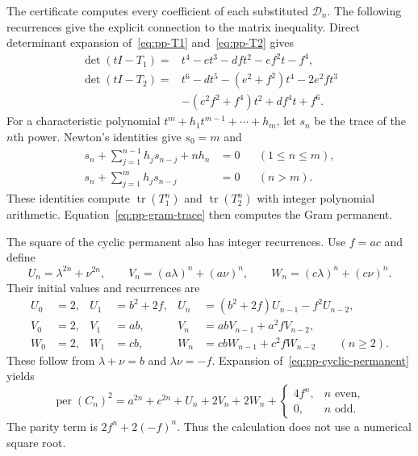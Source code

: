 \documentclass[11pt,a4paper]{article}
\theoremstyle{definition}
\theoremstyle{remark}
\newcommand{\per}{\operatorname{per}}
\begin{document}
The certificate computes every coefficient of each substituted $\mathcal D_n$.
The following recurrences give the explicit connection to the matrix inequality.
Direct determinant expansion of~\eqref{eq:pp-T1} and~\eqref{eq:pp-T2} gives
\begin{equation}\label{eq:pp-characteristic-polynomials}
\begin{aligned}
\det(tI-T_1)
={}&t^4-et^3-dft^2-ef^2t-f^4,\\
\det(tI-T_2)
={}&t^6-dt^5-(e^2+f^2)t^4-2e^2ft^3\\
&-(e^2f^2+f^4)t^2+df^4t+f^6.
\end{aligned}
\end{equation}
For a characteristic polynomial $t^m+h_1t^{m-1}+\cdots+h_m$, let $s_n$ be the trace of the $n$th power.
Newton's identities give $s_0=m$ and
\begin{equation}\label{eq:pp-newton}
\begin{aligned}
s_n+\sum_{j=1}^{n-1}h_js_{n-j}+nh_n&=0
&& (1\le n\le m),\\
s_n+\sum_{j=1}^{m}h_js_{n-j}&=0
&& (n>m).
\end{aligned}
\end{equation}
These identities compute $\operatorname{tr}(T_1^n)$ and $\operatorname{tr}(T_2^n)$ with integer polynomial arithmetic.
Equation~\eqref{eq:pp-gram-trace} then computes the Gram permanent.

The square of the cyclic permanent also has integer recurrences.
Use $f=ac$ and define
\[
U_n=\lambda^{2n}+\nu^{2n},\qquad
V_n=(a\lambda)^n+(a\nu)^n,\qquad
W_n=(c\lambda)^n+(c\nu)^n.
\]
Their initial values and recurrences are
\begin{equation}\label{eq:pp-root-recurrences}
\begin{aligned}
U_0&=2,& U_1&=b^2+2f,&
U_n&=(b^2+2f)U_{n-1}-f^2U_{n-2},\\
V_0&=2,& V_1&=ab,&
V_n&=abV_{n-1}+a^2fV_{n-2},\\
W_0&=2,& W_1&=cb,&
W_n&=cbW_{n-1}+c^2fW_{n-2}
\qquad(n\ge2).
\end{aligned}
\end{equation}
These follow from $\lambda+\nu=b$ and $\lambda\nu=-f$.
Expansion of~\eqref{eq:pp-cyclic-permanent} yields
\begin{equation}\label{eq:pp-permanent-square}
\per(C_n)^2
=a^{2n}+c^{2n}+U_n+2V_n+2W_n+
\begin{cases}
4f^n,&n\text{ even},\\
0,&n\text{ odd}.
\end{cases}
\end{equation}
The parity term is $2f^n+2(-f)^n$.
Thus the calculation does not use a numerical square root.
\end{document}
